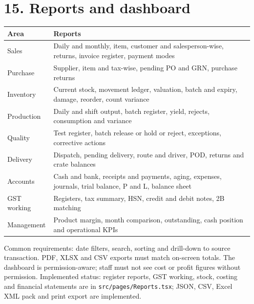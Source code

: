 \documentclass[11pt]{article}
\begin{document}
\section{15. Reports and dashboard}
\begin{center}\small\begin{tabularx}{\linewidth}{|*{2}{>{\raggedright\arraybackslash}X|}}
\hline
\textbf{Area} & \textbf{Reports} \\
\hline
Sales & Daily and monthly, item, customer and salesperson-wise, returns, invoice register, payment modes \\
\hline
Purchase & Supplier, item and tax-wise, pending PO and GRN, purchase returns \\
\hline
Inventory & Current stock, movement ledger, valuation, batch and expiry, damage, reorder, count variance \\
\hline
Production & Daily and shift output, batch register, yield, rejects, consumption and variance \\
\hline
Quality & Test register, batch release or hold or reject, exceptions, corrective actions \\
\hline
Delivery & Dispatch, pending delivery, route and driver, POD, returns and crate balances \\
\hline
Accounts & Cash and bank, receipts and payments, aging, expenses, journals, trial balance, P and L, balance sheet \\
\hline
GST working & Registers, tax summary, HSN, credit and debit notes, 2B matching \\
\hline
Management & Product margin, month comparison, outstanding, cash position and operational KPIs \\
\hline
\end{tabularx}\end{center}
Common requirements: date filters, search, sorting and drill-down to source transaction. PDF, XLSX and CSV exports must match on-screen totals. The dashboard is permission-aware; staff must not see cost or profit figures without permission.
Implemented status: register reports, GST working, stock, costing and financial statements are in \texttt{src/pages/Reports.tsx}; JSON, CSV, Excel XML pack and print export are implemented.
\clearpage
\end{document}

